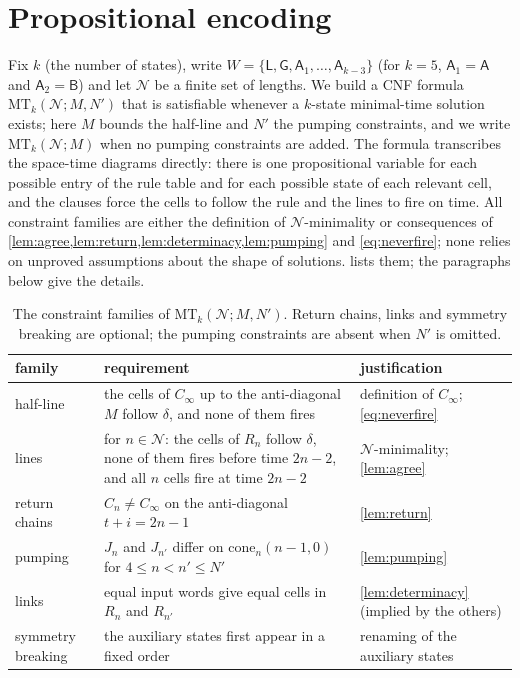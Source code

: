 \section{Propositional encoding}\label{sec:encoding}

Fix $k$ (the number of states), write
$W=\{\mathsf L,\mathsf G,\mathsf A_1,\dots,\mathsf A_{k-3}\}$ (for $k=5$,
$\mathsf A_1=\mathsf A$ and $\mathsf A_2=\mathsf B$) and let $\mathcal N$ be a finite set of lengths. We build a CNF formula
$\mathrm{MT}_k(\mathcal N;M,N')$ that is satisfiable whenever a $k$-state
minimal-time solution exists; here $M$ bounds the half-line and $N'$ the
pumping constraints, and we write $\mathrm{MT}_k(\mathcal N;M)$ when no
pumping constraints are added. The formula transcribes the space-time
diagrams directly: there is one propositional variable for each possible
entry of the rule table and for each possible state of each relevant cell,
and the clauses force the cells to follow the rule and the lines to fire on
time. All constraint families are either the definition of
$\mathcal N$-minimality or consequences of
\cref{lem:agree,lem:return,lem:determinacy,lem:pumping} and
\eqref{eq:neverfire}; none relies on unproved assumptions about the shape of
solutions.  lists them; the paragraphs below give the
details.

\begin{table}[t]
\centering\small
\begin{tabular}{@{}>{\raggedright\arraybackslash}p{}>{\raggedright\arraybackslash}p{}>{\raggedright\arraybackslash}p{}@{}}
\toprule
family & requirement & justification\\
\midrule
half-line & the cells of $C_\infty$ up to the anti-diagonal $M$ follow $\delta$,
  and none of them fires & definition of $C_\infty$; \eqref{eq:neverfire}\\
lines & for $n\in\mathcal N$: the cells of $R_n$ follow $\delta$, none of them
  fires before time $2n-2$, and all $n$ cells fire at time $2n-2$ &
  $\mathcal N$-minimality; \cref{lem:agree}\\
return chains & $C_n\ne C_\infty$ on the anti-diagonal $t+i=2n-1$ &
  \cref{lem:return}\\
pumping & $J_n$ and $J_{n'}$ differ on $\mathrm{cone}_n(n-1,0)$ for
  $4\le n<n'\le N'$ & \cref{lem:pumping}\\
links & equal input words give equal cells in $R_n$ and $R_{n'}$ &
  \cref{lem:determinacy} (implied by the others)\\
symmetry breaking & the auxiliary states first appear in a fixed order &
  renaming of the auxiliary states\\
\bottomrule
\end{tabular}
\caption{The constraint families of $\mathrm{MT}_k(\mathcal N;M,N')$. Return
chains, links and symmetry breaking are optional; the pumping constraints are
absent when $N'$ is omitted.}
\label{tab:families}
\end{table}

